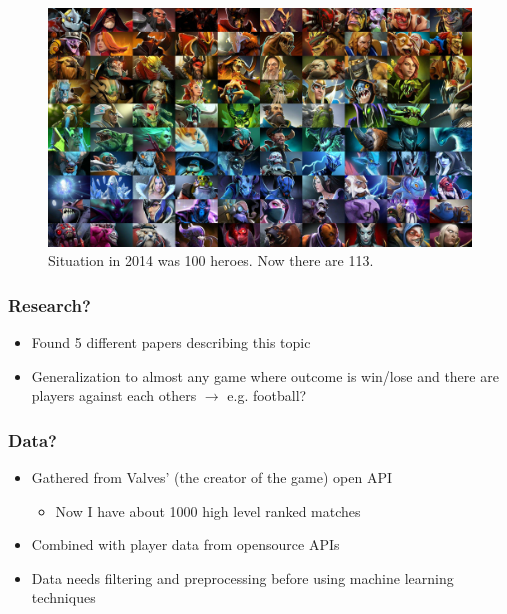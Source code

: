 \documentclass[english]{beamer}
\begin{document}
	\begin{frame}
		\begin{figure}[c]
		\includegraphics[scale=0.11]{heroes}
		\caption{Situation in 2014 was 100 heroes. Now there are 113.}
		\end{figure}
	\end{frame}	
	
	\begin{frame}
		\frametitle{Research?}
		\begin{itemize}
			\item Found 5 different papers describing this topic
			\item Generalization to almost any game where outcome is win/lose and there are players against each others $\rightarrow$ e.g. football?
		\end{itemize}
	\end{frame}			
	
	\begin{frame}
		\frametitle{Data?}
		\begin{itemize}
			\item Gathered from Valves' (the creator of the game) open API
			\begin{itemize}
				\item Now I have about 1000 high level ranked matches
			\end{itemize}
			\item Combined with player data from opensource APIs
			\item Data needs filtering and preprocessing before using machine learning techniques
		\end{itemize}
	\end{frame}
	
	
\end{document}
